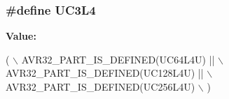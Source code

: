 \subsubsection[{U\+C3\+L4}]{\setlength{\rightskip}{0pt plus 5cm}\#define U\+C3\+L4}\label{group__uc3__part__macros__group_gae119ee2bcbfe63aa6cb0bc92245943f6}
{\bfseries Value\+:}
\begin{DoxyCode}
(   \(\backslash\)
        AVR32\_PART\_IS\_DEFINED(UC64L4U)  || \(\backslash\)
        AVR32\_PART\_IS\_DEFINED(UC128L4U) || \(\backslash\)
        AVR32\_PART\_IS\_DEFINED(UC256L4U) \(\backslash\)
        )
\end{DoxyCode}
